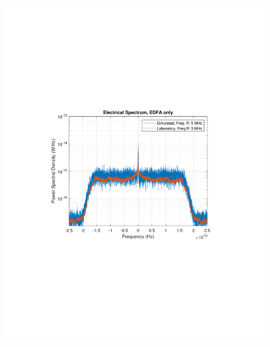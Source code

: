 	\begin{figure}[H]
		\centering
		\begin{minipage}{0.43\textwidth}
			\centering
			\includegraphics[clip, trim=3cm 8cm 3cm 8cm,
			width=1\textwidth]{./sdf/m_qam_system/figures/experimental/noiseSpectra/edfaOnly.pdf}
			\subcaption{\label{fig:oscNSimul}}
		\end{minipage}
		\begin{minipage}{0.43\textwidth}
			\centering

\end{minipage}
\end{figure}
